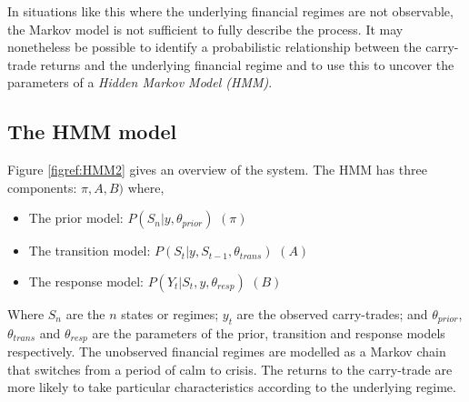 \documentclass[12pt, a4paper, oneside]{article} %
\begin{document}
In situations like this where the underlying financial regimes are not observable, the Markov model is not sufficient to fully describe the process. It may nonetheless be possible to identify a probabilistic relationship between the carry-trade returns and the underlying financial regime and to use this to uncover the parameters of a \emph{Hidden Markov Model (HMM)}. 
 
\subsection{The HMM model}
Figure \ref{figref:HMM2} gives an overview of the system.  The HMM has three components: $\pi, A, B)$ where,

\begin{itemize}
\item The prior model: $P(S_n|y, \theta_{prior})$ $(\pi)$
\item The transition model: $P(S_t|y, S_{t-1}, \theta_{trans})$ $(A)$
\item The response model: $P(Y_t| S_t, y, \theta_{resp})$ $(B)$
\end{itemize}

Where $S_n$ are the $n$ states or regimes; $y_t$ are the observed carry-trades; and $\theta_{prior}$, $\theta_{trans}$ and  $\theta_{resp}$ are the parameters of the prior, transition and response models respectively. The unobserved financial regimes are modelled as a Markov chain that switches from a period of calm to crisis.  The returns to the carry-trade are more likely to take particular characteristics according to the underlying regime.   
\end{document}
